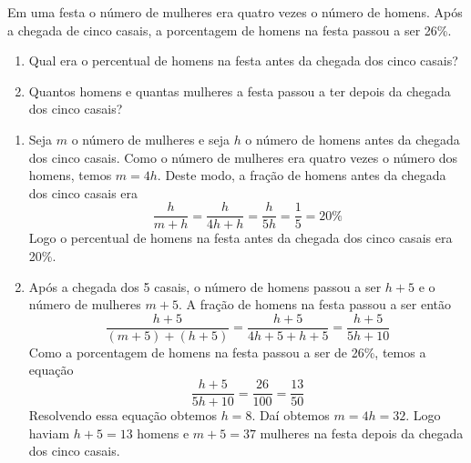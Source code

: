 \begin{problem}
Em uma festa o número de mulheres era quatro vezes o número de homens.
Após a chegada de cinco casais, a porcentagem de homens na festa passou a ser 26\%.
\begin{enumerate}
\item[(a)] Qual era o percentual de homens na festa antes da chegada dos cinco casais?
\item[(b)] Quantos homens e quantas mulheres a festa passou a ter depois da chegada dos cinco casais?
\end{enumerate}
\end{problem}
\begin{solution}
\begin{enumerate}
\item[(a)] Seja $m$ o número de mulheres e seja $h$ o número de homens antes da chegada dos cinco casais.
Como o número de mulheres era quatro vezes o número dos homens, temos $m=4h$.
Deste modo, a fração de homens antes da chegada dos cinco casais era
$$\dfrac{h}{m+h} = \dfrac{h}{4h+h} = \dfrac{h}{5h} = \dfrac{1}{5} = 20\% $$
Logo o percentual de homens na festa antes da chegada dos cinco casais era 20\%.

\item[(b)] Após a chegada dos 5 casais, o número de homens passou a ser $h+5$ e o número de mulheres $m+5$.
A fração de homens na festa passou a ser então
$$\dfrac{h+5}{(m+5)+(h+5)} = \dfrac{h+5}{4h+5+h+5} = \dfrac{h+5}{5h+10}$$
Como a porcentagem de homens na festa passou a ser de 26\%, temos a equação 
$$\dfrac{h+5}{5h+10} = \dfrac{26}{100} = \dfrac{13}{50}$$
Resolvendo essa equação obtemos $h=8$. Daí obtemos $m=4h=32$.
Logo haviam $h+5=13$ homens e $m+5=37$ mulheres na festa depois da chegada dos cinco casais.
\end{enumerate}
\end{solution}

